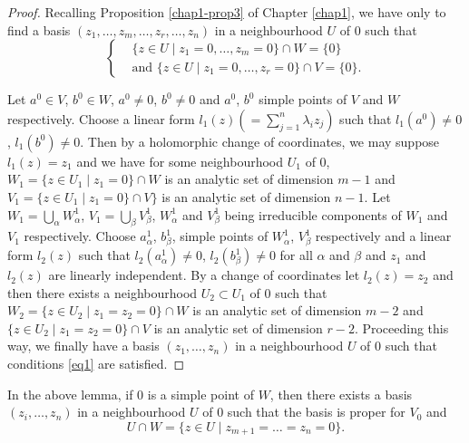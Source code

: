 \begin{proof} %
  Recalling Proposition \ref{chap1-prop3} of Chapter \ref{chap1}, we
  have only to find a basis 
  $(z_{1},\ldots, z_{m},\ldots,z_{r},\ldots,z_{n})$ in a neighbourhood
  $U$ of $0$ such that  
\begin{equation*}
  \begin{cases}
    & \{z \in U \mid z_{1} = 0, \ldots , z_{m} =0 \} \cap W = \{0\}\\
    & \text{and \ \ } \{z \in U \mid z_{1} = 0, \ldots , z_{r} =0 \}
    \cap V = \{0\}. 
  \end{cases}\tag{1}\label{eq1}
\end{equation*}

Let $a^{0}\in V$, $b^{0}\in W$, $a^{0} \neq 0$, $b^{0}
\neq 0$  and $a^{0}$, $b^{0}$ simple points of $V$ and $W$
respectively. Choose a linear form $l_{1}(z) (=
\sum^{n}_{j=1} \lambda_{i} z_{j})$   such that 
 $l_{1}(a^{0}) \neq 0$, $l_{1} (b^{0}) \neq 0$. Then by a
 holomorphic change of coordinates, we may suppose $l_{1}(z) = z_{1}$
 and we have for some neighbourhood $U_{1}$ of $0$, $W_{1} = \{z \in
 U_{1} \mid z_{1} = 0\} \cap W$ is an analytic set of dimension $m-1$
 and\pageoriginale $V_{1}= \{z \in U_{1} \mid z_{1} = 0\} \cap V\}$
 is an analytic 
  set of dimension $n-1$. Let $W_{1}= \bigcup_{\alpha}
 W^{1}_{\alpha}$, $V_{1} =\bigcup_{\beta} V^{1}_{\beta}$,
 $W^{1}_{\alpha}$ and $V^{1}_{\beta}$ being irreducible components of
 $W_{1}$ and $V_{1}$ respectively.
 Choose $a^{1}_{\alpha}$, $b^{1}_{\beta}$, simple points of
 $W^{1}_{\alpha}$, $V^{1}_{\beta}$ respectively and a linear form
 $l_{2}(z)$ such that $l_{2}(a^{1}_{\alpha}) \neq 0$,
 $l_{2}(b^{1}_{\beta}) \neq 0$ for all $\alpha$ and $\beta$ and
 $z_{1}$ and $l_{2}(z)$ 
 are linearly independent. By a change of coordinates let $l_{2}(z) =
 z_{2}$ and then there exists  a neighbourhood $U_{2} \subset U_{1}$
 of $0$ such that $W_{2} = \{z \in U_{2} \mid z_{1} = z_{2} = 0\} \cap
 W$ is an analytic set of dimension $m-2$ and 
 $ \{z \in U_{2} \mid z_{1} = z_{2} = 0\} \cap V$  is an analytic set
 of dimension $r-2$. Proceeding this way, we finally have a basis 
$(z_{1}, \ldots , z_{n})$ in a neighbourhood $U$ of $0$ such that
 conditions \eqref{eq1} are satisfied. 
\end{proof}

\begin{remark}\label{chap3-rem8}%
   In the above lemma, if $0$ is a simple point of $W$, then there
   exists a basis $(z_{i}, \ldots , z_{n})$ in a neighbourhood $U$ of
   $0$ such that the basis is proper for $V_{0}$ and  
   $$ 
   U \cap W = \big\{z \in U \mid z_{m+1} = \ldots = z_{n} = 0\big\}.
   $$
 \end{remark}

